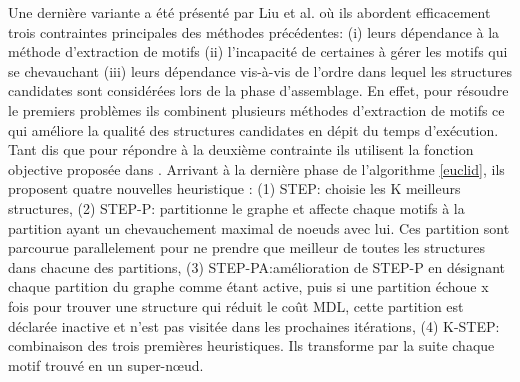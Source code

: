 		Une dernière variante a été présenté par Liu et al. \citep{liu2018reducing} où ils abordent efficacement trois contraintes principales des  méthodes précédentes: 
				(i) leurs dépendance à la méthode d'extraction de motifs 
				(ii) l'incapacité de certaines à gérer les motifs qui se chevauchant 
				(iii) leurs dépendance vis-à-vis de l'ordre dans lequel les structures candidates sont considérées lors de la phase d'assemblage. En effet, pour résoudre le premiers problèmes ils combinent plusieurs méthodes d'extraction de motifs ce qui améliore la qualité des structures candidates en dépit  du temps d'exécution. Tant dis que pour répondre à la deuxième contrainte ils utilisent la fonction objective proposée dans \citep{liu2015empirical}. Arrivant à la dernière phase de l'algorithme \ref{euclid}, ils proposent quatre nouvelles heuristique : 
				(1) STEP: choisie les K  meilleurs structures, 
				(2) STEP-P: partitionne le graphe et affecte chaque motifs  à la partition ayant un chevauchement maximal de noeuds avec lui. Ces partition sont parcourue parallelement pour ne prendre que meilleur de toutes les structures dans chacune des partitions,
				(3) STEP-PA:amélioration de  STEP-P en désignant chaque partition du graphe comme étant active, puis si une partition échoue x fois pour trouver une structure qui réduit le coût MDL, cette partition est déclarée inactive et n'est pas visitée dans les prochaines itérations,
				 (4) K-STEP: combinaison des trois premières heuristiques. Ils transforme par la suite chaque motif trouvé en un super-nœud.		